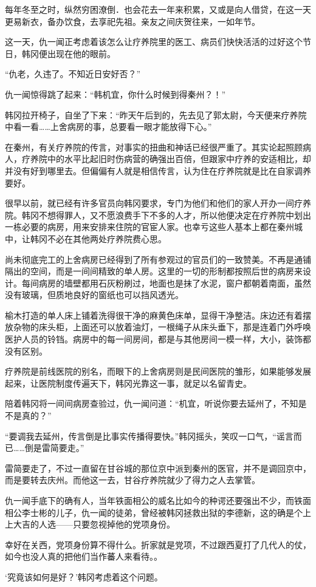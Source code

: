 每年冬至之时，纵然穷困潦倒．也会花去一年来积累，又或是向人借贷，在这一天更易新衣，备办饮食，去享祀先祖。亲友之间庆贺往来，一如年节。

这一天，仇一闻正考虑着该怎么让疗养院里的医工、病员们快快活活的过好这个节日，韩冈便出现在他的眼前。

“仇老，久违了。不知近日安好否？”

仇一闻惊得跳了起来：“韩机宜，你什么时候到得秦州？！”

韩冈拉开椅子，自坐了下来：“昨天午后到的，先去见了郭太尉，今天便来疗养院中看一看……上舍病房的事，总要看一眼才能放得下心。”

在秦州，有关疗养院的传言，对事实的扭曲和神话已经很严重了。其实论起照顾病人，疗养院中的水平比起旧时伤病营的确强出百倍，但跟家中疗养的安适相比，却并没有好到哪里去。但偏偏有人就是相信传言，认为住在疗养院就是比在自家调养要好。

很早以前，就已经有许多官员向韩冈要求，专门为他们和他们的家人开办一间疗养院。韩冈不想得罪人，又不愿浪费手下不多的人才，所以他便决定在疗养院中划出一栋必要的病房，用来安排来住院的官宦人家。也幸亏这些人基本上都在秦州城中，让韩冈不必在其他两处疗养院费心思。

尚未彻底完工的上舍病房已经得到了所有参观过的官员们的一致赞美。不再是通铺隔出的空间，而是一间间精致的单人房。这里的一切的形制都按照后世的病房来设计。每间病房的墙壁都用石灰粉刷过，地面也是抹了水泥，窗户都朝着南面，虽然没有玻璃，但质地良好的窗纸也可以挡风透光。

榆木打造的单人床上铺着洗得很干净的麻黄色床单，显得干净整洁。床边还有着摆放杂物的床头柜，上面还可以放着油灯，一根绳子从床头垂下，那是连着门外呼唤医护人员的铃铛。病房中的每一间房间，都是与其他房间一模一样，大小，装饰都没有区别。

疗养院是前线医院的别名，而眼下的上舍病房则是民间医院的雏形，如果能够发展起来，让医院制度传遍天下，韩冈光靠这一事，就足以名留青史。

陪着韩冈将一间间病房查验过，仇一闻问道：“机宜，听说你要去延州了，不知是不是真的？”

“要调我去延州，传言倒是比事实传播得要快。”韩冈摇头，笑叹一口气，“谣言而已……倒是雷简要走。”

雷简要走了，不过一直留在甘谷城的那位京中派到秦州的医官，并不是调回京中，而是要转去庆州。而他这一去，甘谷疗养院就少了得力之人去掌管。

仇一闻手底下的确有人，当年铁面相公的威名比如今的种谔还要强出不少，而铁面相公李士彬的儿子，仇一闻的徒弟，曾经被韩冈拯救出狱的李德新，这的确是个上上大吉的人选——只要忽视掉他的党项身份。

幸好在关西，党项身份算不得什么。折家就是党项，不过跟西夏打了几代人的仗，如今也没人真的把他们当作蕃人来看待。。

‘究竟该如何是好？’韩冈考虑着这个问题。

